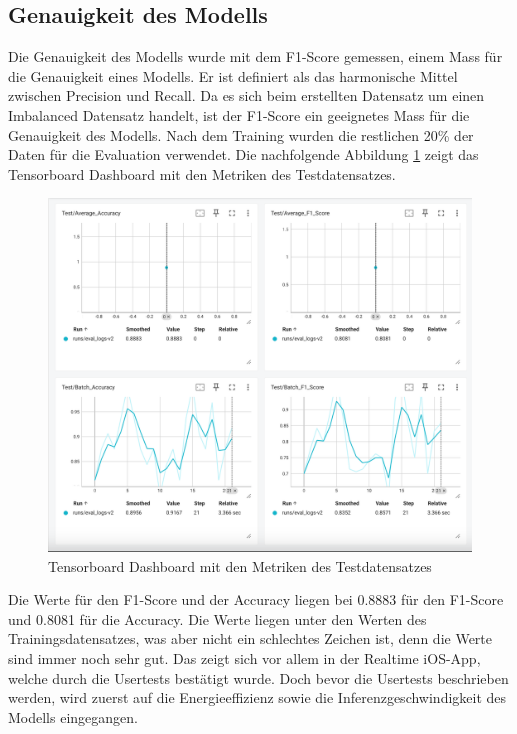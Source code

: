 \documentclass[11pt,a4paper]{article}
\begin{document}
\subsection{Genauigkeit des Modells}
Die Genauigkeit des Modells wurde mit dem F1-Score gemessen, einem Mass für die 
Genauigkeit eines Modells. Er ist definiert als das harmonische Mittel zwischen Precision und 
Recall. Da es sich beim erstellten Datensatz um einen Imbalanced Datensatz handelt, ist der F1-Score 
ein geeignetes Mass für die Genauigkeit des Modells. Nach dem Training wurden die restlichen 
20\% der Daten für die Evaluation verwendet. Die nachfolgende Abbildung \ref{fig:test} zeigt das 
Tensorboard Dashboard mit den Metriken des Testdatensatzes. 

\begin{figure}[H]
	\centering
	\includegraphics[width=1.0\linewidth]{img/test/test.png}
	\caption{Tensorboard Dashboard mit den Metriken des Testdatensatzes}
	\label{fig:test}	
\end{figure}

\noindent \newline
Die Werte für den F1-Score und der Accuracy liegen bei 0.8883 für den F1-Score und 0.8081 für die 
Accuracy. Die Werte liegen unter den Werten des Trainingsdatensatzes, was aber nicht ein schlechtes 
Zeichen ist, denn die Werte sind immer noch sehr gut. Das zeigt sich vor allem in der Realtime 
iOS-App, welche durch die Usertests bestätigt wurde. Doch bevor die Usertests beschrieben werden, 
wird zuerst auf die Energieeffizienz sowie die Inferenzgeschwindigkeit des Modells eingegangen.
\end{document}
